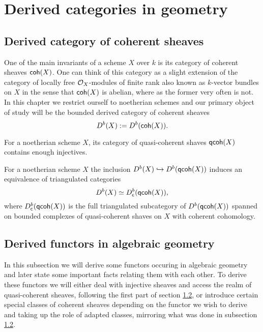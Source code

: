 \section{Derived categories in geometry}
\label{Derived categories in geometry}

\subsection{Derived category of coherent sheaves}

One of the main invariants of a scheme $X$ over $k$ is its category of coherent sheaves $\mathsf{coh}(X)$. One can think of this category as a slight extension of the category of locally free $\mathcal O_X$-modules of finite rank also known as $k$-vector bundles on $X$ in the sense that $\mathsf{coh}(X)$ is abelian, where as the former very often is not. In this chapter we restrict ourself to noetherian schemes and our primary object of study will be the bounded derived category of coherent sheaves
\[
    D^b(X) := D^b(\mathsf{coh}(X)).
\]

\begin{proposition}
    For a noetherian scheme $X$, its category of quasi-coherent shaves $\mathsf{qcoh}(X)$ contains enough injectives.
\end{proposition}

\begin{proposition}
    For a noetherian scheme $X$ the inclusion $D^b(X) \hookrightarrow D^b(\mathsf{qcoh}(X))$ induces an equivalence of triangulated categories
    \[
        D^b(X) \simeq D^b_{\mathsf{c}}(\mathsf{qcoh}(X)),
    \]
    where $D^b_{\mathsf{c}}(\mathsf{qcoh}(X))$ is the full triangulated subcategory of $D^b(\mathsf{qcoh}(X))$ spanned on bounded complexes of quasi-coherent shaves on $X$ with coherent cohomology.
\end{proposition}

\begin{proposition}
    
\end{proposition}

\newpage

\subsection{Derived functors in algebraic geometry}

In this subsection we will derive some functors occuring in algebraic geometry and later state some important facts relating them with each other. To derive these functors we will either deal with injective sheaves and access the realm of quasi-coherent sheaves, following the first part of section \ref{}, or introduce certain special classes of coherent sheaves depending on the functor we wish to derive and taking up the role of adapted classes, mirroring what was done in subsection \ref{}.

